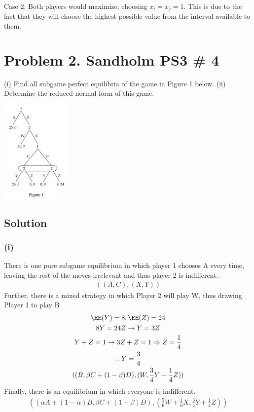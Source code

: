 \documentclass[10pt, a4paper]{article}
\begin{document}
    Case 2:
    Both players would maximize, choosing $x_i=x_j=1$. This is due to the fact that they will choose the highest possible value from the interval available to them.
\section*{Problem 2. Sandholm PS3 \# 4}
  (i) Find all subgame perfect equilibria of the game in Figure 1 below.
  (ii) Determine the reduced normal form of this game. 
  \begin{center}
    \includegraphics[width = 0.25\textwidth]{fig1.png}
  \end{center}
  \subsection*{Solution}
    \subsubsection*{(i)}
      There is one pure subgame equilibrium in which player 1 chooses A every time, leaving the rest of the moves irrelevant and thus player 2 is indifferent.
      \begin{gather*}
        ((A,C),(X,Y))
      \end{gather*}
      Further, there is a mixed strategy in which Player 2 will play W, thus drawing Player 1 to play B
      \begin{gather*}
        \EE(Y) = 8, \EE(Z) = 24 \\
        8Y = 24Z \rightarrow Y = 3Z \\
        Y + Z = 1 \rightarrow 3Z + Z = 1 \Rightarrow Z = \frac{1}{4} \\ 
        \therefore Y = \frac{3}{4} \\
        ((B, \beta C + (1-\beta)D), (W, \frac{3}{4}Y + \frac{1}{4}Z))
      \end{gather*}
      Finally, there is an equilibrium in which everyone is indifferent.
      \begin{gather*}
        ((\alpha A + (1-\alpha)B, \beta C + (1-\beta)D),(\frac{5}{6}W + \frac{1}{6}X,\frac{3}{4}Y+\frac{1}{4}Z))
      \end{gather*}
\end{document}
